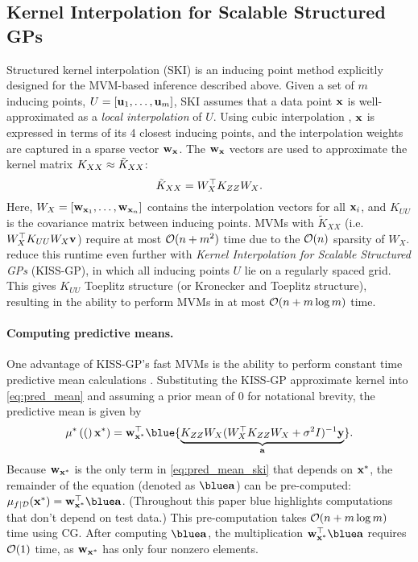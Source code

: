 \subsection{Kernel Interpolation for Scalable Structured GPs}
Structured kernel interpolation (SKI) \cite{wilson2015kernel} is an inducing point method explicitly designed for the MVM-based inference described above.
Given a set of $m$ inducing points, $U = [\mathbf{u}_1, \ldots, \mathbf{u}_m]$, SKI assumes that a data point $\mathbf{x}$ is well-approximated as a \emph{local interpolation} of $U$.
Using cubic interpolation \cite{keys1981cubic}, $\mathbf{x}$ is expressed in terms of its 4 closest inducing points, and the interpolation weights are captured in a sparse vector $\mathbf{w}_{\mathbf{x}}$.
The $\mathbf{w}_{\mathbf{x}}$ vectors are used to approximate the kernel matrix $K_{XX} \approx \tilde K_{XX}$:
%
\begin{equation}
  \tilde K_{X X} = W_{X}^\top K_{ZZ} W_{X}.
  \label{eq:ski}
\end{equation}
%
Here, $W_{X} = [\mathbf{w}_{\mathbf{x}_1}, \ldots, \mathbf{w}_{\mathbf{x}_n}]$ contains the interpolation vectors for all $\mathbf{x}_i$, and $K_{UU}$ is the covariance matrix between inducing points.
MVMs with $\tilde K_{XX}$ (i.e. $W_X^\top K_{UU} W_X \mathbf{v}$) require at most $\bigo{n + m^2}$ time due to the $\bigo{n}$ sparsity of $W_X$.
\citet{wilson2015kernel} reduce this runtime even further with \emph{Kernel Interpolation for Scalable Structured GPs} (KISS-GP),
in which all inducing points $U$ lie on a regularly spaced grid.
This gives $K_{UU}$ Toeplitz structure (or Kronecker and Toeplitz structure),
resulting in the ability to perform MVMs in at most $\bigo{n + m \log m}$ time.

%
\paragraph{Computing predictive means.}
One advantage of KISS-GP's fast MVMs is the ability to perform constant time predictive mean calculations \cite{wilson2015thoughts}.
Substituting the KISS-GP approximate kernel into \eqref{eq:pred_mean} and assuming a prior mean of 0 for notational brevity, the predictive mean is given by
\begin{equation}
  \meantest(\bxtest) = \bw_{\bxtest}^\top \blue{\underbrace{\bK_{\bZ\bZ} \bW_{\bX}(\bW_{\bX}^{\top}\bK_{\bZ\bZ}\bW_{\bX} + \sigma^{2} \bI)^{-1} \by}_{\ba}}.
  \label{eq:pred_mean_ski}
\end{equation}
Because $\mathbf{w}_{\mathbf{x}^{*}}$ is the only term in \eqref{eq:pred_mean_ski} that depends on $\mathbf{x}^{*}$, the remainder of the equation (denoted as $\blue\ba$) can be pre-computed: $\mu_{f \mid \dset}(\bx^{*}) = \bw_{\bx^{*}}^\top \blue \ba$.
(Throughout this paper {\color{blue} blue} highlights computations that don't depend on test data.)
This pre-computation takes $\bigo{n + m\log m}$ time using CG.
After computing $\blue \ba$, the multiplication $\bw_{\bx^{*}}^\top \blue \ba$ requires $\bigo{1}$ time, as $\mathbf{w}_{\mathbf{x}^{*}}$ has only four nonzero elements.
